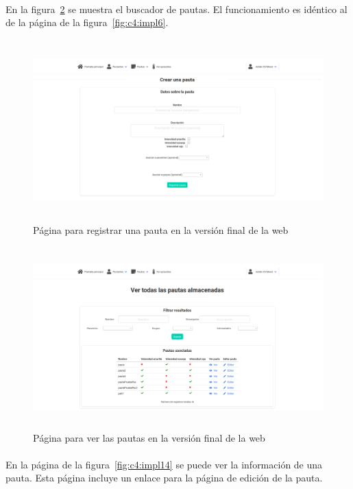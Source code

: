 \paragraph{}
En la figura~\ref{fig:c4:impl13} se muestra el buscador de pautas. El funcionamiento es idéntico al de la página de la figura~\ref{fig:c4:impl6}.

\begin{figure}[H]
    \centering
    \includegraphics[height=7cm, width=\textwidth]{Imagenes/8-registrarPauta.png}
    \caption[Página para registrar una pauta en la versión final de la web]{Página para registrar una pauta en la versión final de la web}
    \label{fig:c4:impl12}
\end{figure}

\begin{figure}[H]
    \centering
    \includegraphics[height=7cm, width=\textwidth]{Imagenes/9-verPautas.png}
    \caption[Página para ver las pautas en la versión final de la web]{Página para ver las pautas en la versión final de la web}
    \label{fig:c4:impl13}
\end{figure}

\paragraph{}
En la página de la figura~\ref{fig:c4:impl14} se puede ver la información de una pauta. Esta página incluye un enlace para la página de edición de la pauta.

